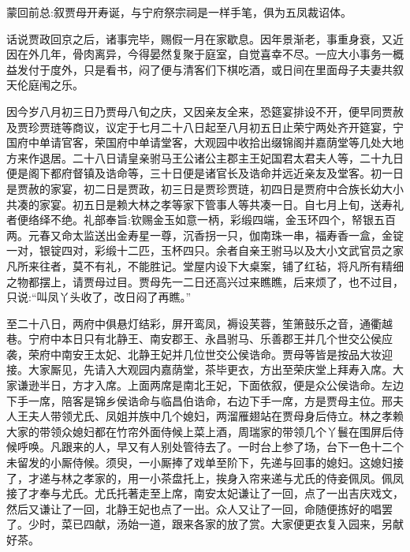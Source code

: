 

\begin{parag}
    \begin{note}蒙回前总:叙贾母开寿诞，与宁府祭宗祠是一样手笔，俱为五凤裁诏体。\end{note}
\end{parag}


\begin{parag}
    话说贾政回京之后，诸事完毕，赐假一月在家歇息。因年景渐老，事重身衰，又近因在外几年，骨肉离异，今得晏然复聚于庭室，自觉喜幸不尽。一应大小事务一概益发付于度外，只是看书，闷了便与清客们下棋吃酒，或日间在里面母子夫妻共叙天伦庭闱之乐。
\end{parag}


\begin{parag}
    因今岁八月初三日乃贾母八旬之庆，又因亲友全来，恐筵宴排设不开，便早同贾赦及贾珍贾琏等商议，议定于七月二十八日起至八月初五日止荣宁两处齐开筵宴，宁国府中单请官客，荣国府中单请堂客，大观园中收拾出缀锦阁并嘉荫堂等几处大地方来作退居。二十八日请皇亲驸马王公诸公主郡主王妃国君太君夫人等，二十九日便是阁下都府督镇及诰命等，三十日便是诸官长及诰命并远近亲友及堂客。初一日是贾赦的家宴，初二日是贾政，初三日是贾珍贾琏，初四日是贾府中合族长幼大小共凑的家宴。初五日是赖大林之孝等家下管事人等共凑一日。自七月上旬，送寿礼者便络绎不绝。礼部奉旨:钦赐金玉如意一柄，彩缎四端，金玉环四个，帑银五百两。元春又命太监送出金寿星一尊，沉香拐一只，伽南珠一串，福寿香一盒，金锭一对，银锭四对，彩缎十二匹，玉杯四只。余者自亲王驸马以及大小文武官员之家凡所来往者，莫不有礼，不能胜记。堂屋内设下大桌案，铺了红毡，将凡所有精细之物都摆上，请贾母过目。贾母先一二日还高兴过来瞧瞧，后来烦了，也不过目，只说:“叫凤丫头收了，改日闷了再瞧。”
\end{parag}


\begin{parag}
    至二十八日，两府中俱悬灯结彩，屏开鸾凤，褥设芙蓉，笙箫鼓乐之音，通衢越巷。宁府中本日只有北静王、南安郡王、永昌驸马、乐善郡王并几个世交公侯应袭，荣府中南安王太妃、北静王妃并几位世交公侯诰命。贾母等皆是按品大妆迎接。大家厮见，先请入大观园内嘉荫堂，茶毕更衣，方出至荣庆堂上拜寿入席。大家谦逊半日，方才入席。上面两席是南北王妃，下面依叙，便是众公侯诰命。左边下手一席，陪客是锦乡侯诰命与临昌伯诰命，右边下手一席，方是贾母主位。邢夫人王夫人带领尤氏、凤姐并族中几个媳妇，两溜雁翅站在贾母身后侍立。林之孝赖大家的带领众媳妇都在竹帘外面侍候上菜上酒，周瑞家的带领几个丫鬟在围屏后侍候呼唤。凡跟来的人，早又有人别处管待去了。一时台上参了场，台下一色十二个未留发的小厮侍候。须臾，一小厮捧了戏单至阶下，先递与回事的媳妇。这媳妇接了，才递与林之孝家的，用一小茶盘托上，挨身入帘来递与尤氏的侍妾佩凤。佩凤接了才奉与尤氏。尤氏托著走至上席，南安太妃谦让了一回，点了一出吉庆戏文，然后又谦让了一回，北静王妃也点了一出。众人又让了一回，命随便拣好的唱罢了。少时，菜已四献，汤始一道，跟来各家的放了赏。大家便更衣复入园来，另献好茶。
\end{parag}


